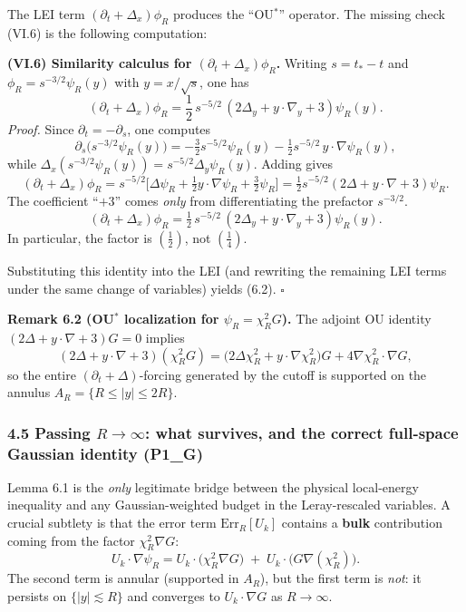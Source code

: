\documentclass[
  11pt,
]{article}
\begin{document}
The LEI term \((\partial_t+\Delta_x)\phi_R\) produces the ``OU\(^\ast\)'' operator. The missing check (VI.6) is the following computation:

\textbf{(VI.6) Similarity calculus for \((\partial_t+\Delta_x)\phi_R\).} Writing \(s=t_\ast-t\) and \(\phi_R=s^{-3/2}\psi_R(y)\) with \(y=x/\sqrt{s}\), one has \[
(\partial_t+\Delta_x)\phi_R
=
\frac{1}{2}\,s^{-5/2}\,(2\Delta_y+y\cdot\nabla_y+3)\psi_R(y).
\] \emph{Proof.} Since \(\partial_t=-\partial_s\), one computes \[
\partial_s\big(s^{-3/2}\psi_R(y)\big)
=
-\tfrac{3}{2}s^{-5/2}\psi_R(y)
-\tfrac12 s^{-5/2}\,y\cdot\nabla\psi_R(y),
\] while \(\Delta_x(s^{-3/2}\psi_R(y))=s^{-5/2}\Delta_y\psi_R(y)\). Adding gives \[
(\partial_t+\Delta_x)\phi_R
=s^{-5/2}\Big[\Delta\psi_R+\tfrac12 y\cdot\nabla\psi_R+\tfrac32\psi_R\Big]
=\tfrac12 s^{-5/2}(2\Delta+y\cdot\nabla+3)\psi_R.
\] The coefficient ``\(+3\)'' comes \emph{only} from differentiating the prefactor \(s^{-3/2}\). \[
(\partial_t+\Delta_x)\phi_R=\tfrac12\,s^{-5/2}\,(2\Delta_y+y\cdot\nabla_y+3)\psi_R(y).
\] In particular, the factor is \((\tfrac12)\), not \((\tfrac14)\).

Substituting this identity into the LEI (and rewriting the remaining LEI terms under the same change of variables) yields (6.2). \(\square\)

\textbf{Remark 6.2 (OU\(^\ast\) localization for \(\psi_R=\chi_R^2G\)).} The adjoint OU identity \((2\Delta+y\cdot\nabla+3)G=0\) implies \[
(2\Delta+y\cdot\nabla+3)(\chi_R^2G)
=
\big(2\Delta\chi_R^2+y\cdot\nabla\chi_R^2\big)G
+4\nabla\chi_R^2\cdot\nabla G,
\] so the entire \((\partial_t+\Delta)\)-forcing generated by the cutoff is supported on the annulus \(A_R=\{R\le|y|\le2R\}\).

\hypertarget{passing-rtoinfty-what-survives-and-the-correct-full-space-gaussian-identity-p1_g}{%
\subsubsection{\texorpdfstring{4.5 Passing \(R\to\infty\): what survives, and the correct full-space Gaussian identity (P1\_G)}{4.5 Passing R\textbackslash to\textbackslash infty: what survives, and the correct full-space Gaussian identity (P1\_G)}}\label{passing-rtoinfty-what-survives-and-the-correct-full-space-gaussian-identity-p1_g}}

Lemma 6.1 is the \emph{only} legitimate bridge between the physical local-energy inequality and any Gaussian-weighted budget in the Leray-rescaled variables. A crucial subtlety is that the error term \(\mathrm{Err}_R[U_k]\) contains a \textbf{bulk} contribution coming from the factor \(\chi_R^2\nabla G\): \[
U_k\cdot\nabla\psi_R
=U_k\cdot\big(\chi_R^2\nabla G\big)\;+\;U_k\cdot\big(G\nabla(\chi_R^2)\big).
\] The second term is annular (supported in \(A_R\)), but the first term is \emph{not}: it persists on \(\{|y|\lesssim R\}\) and converges to \(U_k\cdot\nabla G\) as \(R\to\infty\).
\end{document}
